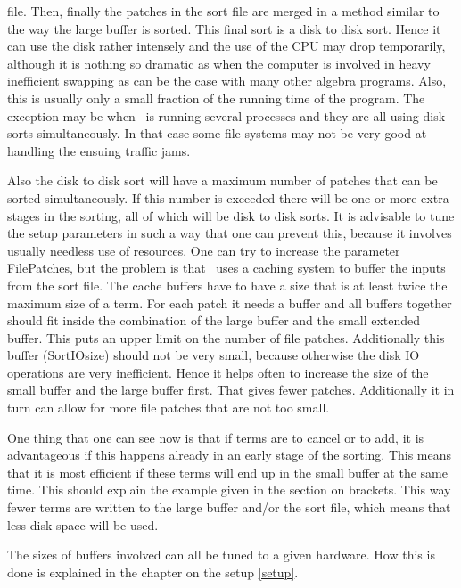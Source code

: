file. Then, finally the patches in the sort file are merged in a method 
similar to the way the large buffer is sorted. This final sort is a 
disk to disk sort. Hence it can use the disk 
rather intensely and the use of the CPU may drop temporarily, although it 
is nothing so dramatic as when the computer is involved in heavy 
inefficient swapping as can be the case with many other algebra programs. 
Also, this is usually only a small fraction of the running time of the 
program. The exception may be when \FORM\ is running several processes and 
they are all using disk sorts simultaneously. In that case some file 
systems may not be very good at handling the ensuing
traffic jams.

Also the disk to disk sort will have a maximum number of patches that can 
be sorted simultaneously. If this number is exceeded there will be one or 
more extra stages in the sorting, all of which 
will be disk to disk sorts. It is advisable to tune the setup parameters in 
such a way that one can prevent this, because it involves usually needless 
use of resources. One can try to increase the parameter 
FilePatches, but the problem is that \FORM\ uses a 
caching system to buffer the inputs from the sort file. The 
cache buffers have to have a size that is at least twice the maximum size 
of a term. For each patch it needs a buffer and all buffers together should 
fit inside the combination of the large buffer and the small extended 
buffer. This puts an upper limit on the number of file patches. 
Additionally this buffer (SortIOsize) should not be very 
small, because otherwise the disk IO operations are very inefficient. Hence 
it helps often to increase the size of the small buffer and the large 
buffer first. That gives fewer patches. Additionally it in turn can allow 
for more file patches that are not too small.

One thing that one can see now is that if terms are to cancel or to add, it 
is advantageous if this happens already in an early stage of the sorting. 
This means that it is most efficient if these terms will end up in the 
small buffer at the same time. This should explain the example given in the 
section on brackets. This way fewer terms are written to 
the large buffer and/or the sort file, which means that less disk space 
will be used.

The sizes of buffers involved can all be tuned to a given hardware. How 
this is done is explained in the chapter on the setup \ref{setup}.

